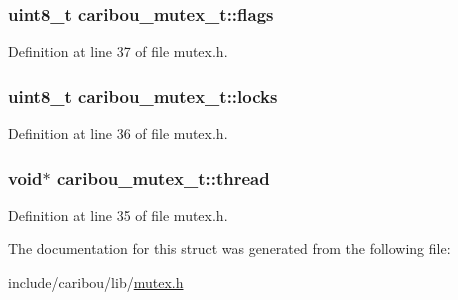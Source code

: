 \hypertarget{structcaribou__mutex__t_aa263fae88561085ee83fde049b400351}{
\subsubsection[{flags}]{\setlength{\rightskip}{0pt plus 5cm}uint8\-\_\-t caribou\-\_\-mutex\-\_\-t\-::flags}}\label{structcaribou__mutex__t_aa263fae88561085ee83fde049b400351}


Definition at line 37 of file mutex.\-h.

\hypertarget{structcaribou__mutex__t_a630c7c086d3492ef2f4ff58a3f7003cc}{
\subsubsection[{locks}]{\setlength{\rightskip}{0pt plus 5cm}uint8\-\_\-t caribou\-\_\-mutex\-\_\-t\-::locks}}\label{structcaribou__mutex__t_a630c7c086d3492ef2f4ff58a3f7003cc}


Definition at line 36 of file mutex.\-h.

\hypertarget{structcaribou__mutex__t_aa286035f1540359f0cd4f0de4a127304}{
\subsubsection[{thread}]{\setlength{\rightskip}{0pt plus 5cm}void$\ast$ caribou\-\_\-mutex\-\_\-t\-::thread}}\label{structcaribou__mutex__t_aa286035f1540359f0cd4f0de4a127304}


Definition at line 35 of file mutex.\-h.



The documentation for this struct was generated from the following file\-:\begin{DoxyCompactItemize}
\item 
include/caribou/lib/\hyperlink{mutex_8h}{mutex.\-h}\end{DoxyCompactItemize}
